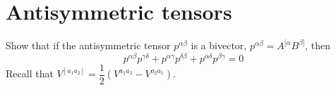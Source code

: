 \documentclass[a4paper, 11pt, oneside]{impression}
\begin{document}
\chapter{Antisymmetric tensors}\label{quest: sixteen}

\begin{exercise}{}
    Show that if the antisymmetric tensor $p^{\alpha\beta}$ is a bivector, $p^{\alpha\beta} = A^{[\alpha} B^{\beta]}$, then
    \begin{equation*}
        p^{\alpha\beta}p^{\gamma\delta} + p^{\alpha\gamma}p^{\delta\beta} + p^{\alpha\delta}p^{\beta\gamma} = 0
    \end{equation*}
    Recall that $V^{[a_{1}a_{2}]} = \dfrac{1}{2}(V^{a_{1}a_{2}} - V^{a_{2}a_{1}})$.
\end{exercise}



\end{document}
